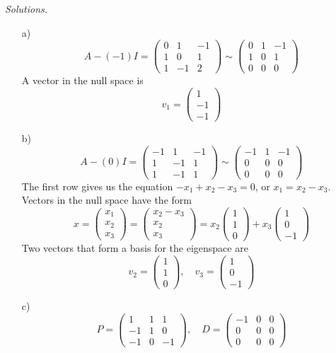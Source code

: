     \ifnum {} {\color{DarkBlue} \textit{Solutions.} 
    \begin{enumerate}
        \item[a)] $$A - (-1) I = \begin{pmatrix} 0&1&-1\\1&0&1\\1&-1&2\end{pmatrix}\sim\begin{pmatrix} 0&1&-1\\1&0&1\\0&0&0\end{pmatrix}$$ A vector in the null space is $$v_1 = \begin{pmatrix}1\\-1\\-1 \end{pmatrix}$$ 
        \item[b)] $$A - (0) I = \begin{pmatrix} -1&1&-1\\1&-1&1\\1&-1&1\end{pmatrix}\sim\begin{pmatrix} -1&1&-1\\0&0&0\\0&0&0\end{pmatrix}$$ The first row gives us the equation $-x_1+x_2-x_3 =0$, or $x_1 = x_2 - x_3$. Vectors in the null space have the form $$x = \begin{pmatrix}x_1\\x_2\\x_3 \end{pmatrix} = \begin{pmatrix}x_2-x_3\\x_2\\x_3 \end{pmatrix} = x_2\begin{pmatrix} 1\\1\\0\end{pmatrix} + x_3 \begin{pmatrix} 1\\0\\-1\end{pmatrix}$$ 
        Two vectors that form a basis for the eigenspace are $$v_2 = \begin{pmatrix} 1\\1\\0\end{pmatrix}, \quad v_3 = \begin{pmatrix} 1\\0\\-1\end{pmatrix}$$ 
        \item[c)] $$P = \begin{pmatrix} 1&1&1\\-1&1&0\\-1&0&-1\end{pmatrix}, \quad D = \begin{pmatrix} -1&0&0\\0&0&0\\0&0&0\end{pmatrix}$$
    \end{enumerate}
    } 
